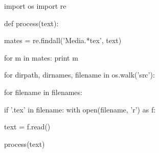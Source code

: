 import os
import re

def process(text):
	
	mates = re.findall('Media.*tex', text)

	for m in mates:
		print m
	

for dirpath, dirnames, filename in os.walk('src'):
	
	for filename in filenames:

		if '.tex' in filename:
			with open(filename, 'r') as f:

				text = f.read()
				
				process(text)
